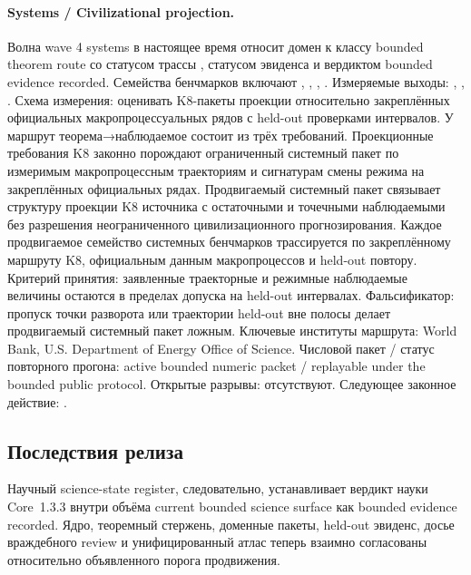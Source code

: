 \paragraph{Systems / Civilizational projection.}
Волна wave 4 systems в настоящее время относит домен к классу bounded theorem route со статусом трассы , статусом эвиденса  и вердиктом bounded evidence recorded.
Семейства бенчмарков включают , \allowbreak {}, \allowbreak {}, \allowbreak {}.
Измеряемые выходы: , \allowbreak {}, \allowbreak {}.
Схема измерения: оценивать K8-пакеты проекции относительно закреплённых официальных макропроцессуальных рядов с held-out проверками интервалов.
У маршрут теорема→наблюдаемое состоит из трёх требований. Проекционные требования K8 законно порождают ограниченный системный пакет по измеримым макропроцессным траекториям и сигнатурам смены режима на закреплённых официальных рядах. Продвигаемый системный пакет связывает структуру проекции K8 источника с остаточными и точечными наблюдаемыми без разрешения неограниченного цивилизационного прогнозирования. Каждое продвигаемое семейство системных бенчмарков трассируется по закреплённому маршруту K8, официальным данным макропроцессов и held-out повтору.
Критерий принятия: заявленные траекторные и режимные наблюдаемые величины остаются в пределах допуска на held-out интервалах.
Фальсификатор: пропуск точки разворота или траектории held-out вне полосы делает продвигаемый системный пакет ложным.
Ключевые институты маршрута: World Bank, \allowbreak U.S. Department of Energy Office of Science.
Числовой пакет / статус повторного прогона: active bounded numeric packet / replayable under the bounded public protocol.
Открытые разрывы: отсутствуют.
Следующее законное действие: .

\subsection{Последствия релиза}
Научный science-state register, следовательно, устанавливает вердикт науки Core~1.3.3 внутри объёма current bounded science surface как bounded evidence recorded.
Ядро, теоремный стержень, доменные пакеты, held-out эвиденс, досье враждебного review и унифицированный атлас теперь взаимно согласованы относительно объявленного порога продвижения.
